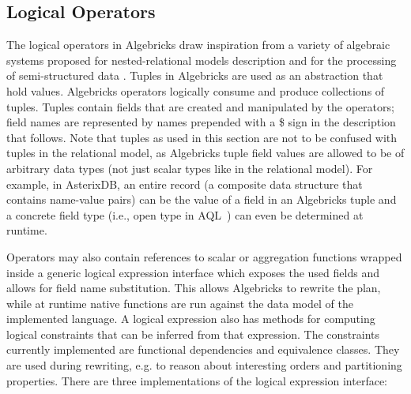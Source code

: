\subsection{Logical Operators}\label{subsec:logoperators}

The logical operators in Algebricks draw inspiration from a variety of algebraic systems proposed for nested-relational models description
\cite{Jaeschke:1982:RAN:588111.588133,NST-Algebra} and for the processing of semi-structured data \cite{Papakonstantinou2003299,Jagadish:2002gu,Deutsch:2004:NFL:1316689.1316706}. 
Tuples in Algebricks are used as an abstraction that hold values.
Algebricks operators logically consume and produce collections of tuples. 
Tuples contain fields that are created and manipulated by the operators; 
field names are represented by names prepended with a \$ sign in the description that follows. 
Note that tuples as used in this section are not to be confused with tuples in the relational model, as Algebricks tuple field
values are allowed to be of arbitrary data types (not just scalar types like in the relational model). 
For example, in AsterixDB, an entire record (a composite data structure that contains name-value pairs) can be the value of a field in an Algebricks tuple and a concrete field type (i.e., open type in AQL~\cite{ASTERIX}) can even be determined at runtime.

Operators may also contain references to scalar or aggregation functions wrapped inside a generic logical expression interface which exposes the used fields and allows for field name substitution. 
This allows Algebricks to rewrite the plan, while at runtime native functions are run against the data model of the implemented language.
A logical expression also has methods for computing logical constraints that can be inferred from that expression.
The constraints currently implemented are functional dependencies and equivalence classes.
They are used during rewriting, e.g. to reason about interesting orders and partitioning properties.
There are three implementations of the logical expression interface:

